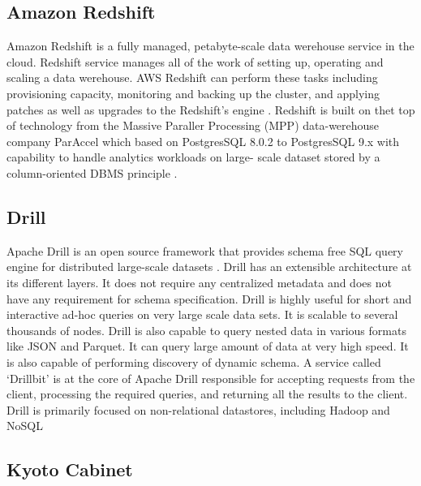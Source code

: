      \pv

     
\subsection{Amazon Redshift}
     
     Amazon Redshift is a fully managed, petabyte-scale data werehouse
     service in the cloud. Redshift service manages all of the work of
     setting up, operating and scaling a data werehouse. AWS Redshift
     can perform these tasks including provisioning capacity,
     monitoring and backing up the cluster, and applying patches as
     well as upgrades to the Redshift's engine \cite{www-redshift}.
     Redshift is built on thet top of technology from the Massive
     Paraller Processing (MPP) data-werehouse company ParAccel which
     based on PostgresSQL 8.0.2 to PostgresSQL 9.x with capability to
     handle analytics workloads on large- scale dataset stored by a
     column-oriented DBMS principle \cite{www-wiki-red}.

\subsection{Drill}

     Apache Drill is an open source framework
     that provides schema free SQL query engine for distributed 
     large-scale datasets \cite{www-ApacheDrill}. Drill
     has an extensible architecture at
     its different layers. It does not require any centralized 
     metadata and does not have any requirement for schema 
     specification. Drill is highly useful for short and interactive
     ad-hoc queries on very large scale data sets. It is scalable to
     several thousands of nodes. Drill is also capable to query 
     nested data in various formats like JSON and Parquet. It can 
     query large amount of data at very high speed. It is also  
     capable of performing discovery of dynamic schema. 
     A service called ‘Drillbit’  is at the core of Apache Drill 
     responsible for accepting requests from the client, processing
     the required queries, and returning all the results to the client.
     Drill is primarily focused on non-relational datastores, 
     including Hadoop and NoSQL

     \pv

\subsection{Kyoto Cabinet}

